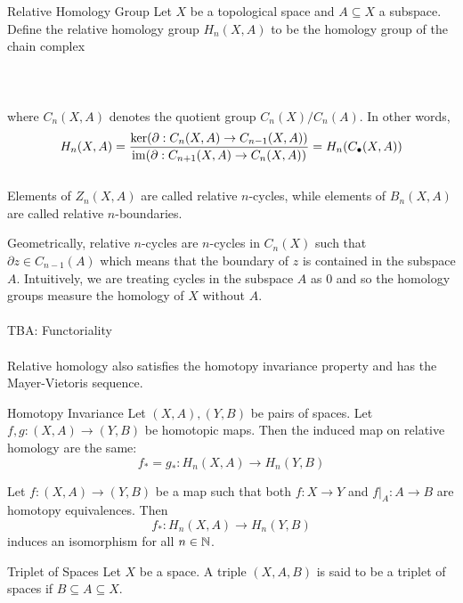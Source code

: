 \documentclass[a4paper]{article}
\begin{document}
\begin{defn}{Relative Homology Group}{} Let $X$ be a topological space and $A\subseteq X$ a subspace. Define the relative homology group $H_n(X,A)$ to be the homology group of the chain complex \\~\\
\\~\\
where $C_n(X,A)$ denotes the quotient group $C_n(X)/C_n(A)$. In other words, $$H_n(X,A)=\frac{\ker(\partial:C_n(X,A)\to C_{n-1}(X,A))}{\operatorname{im}(\partial:C_{n+1}(X,A)\to C_n(X,A))}=H_n(C_\bullet(X,A))$$~\\
Elements of $Z_n(X,A)$ are called relative $n$-cycles, while elements of $B_n(X,A)$ are called relative $n$-boundaries. 
\end{defn}

Geometrically, relative $n$-cycles are $n$-cycles in $C_n(X)$ such that $\partial z\in C_{n-1}(A)$ which means that the boundary of $z$ is contained in the subspace $A$. Intuitively, we are treating cycles in the subspace $A$ as $0$ and so the homology groups measure the homology of $X$ without $A$. \\~\\

TBA: Functoriality\\~\\

Relative homology also satisfies the homotopy invariance property and has the Mayer-Vietoris sequence. 

\begin{thm}{Homotopy Invariance}{} Let $(X,A),(Y,B)$ be pairs of spaces. Let $f,g:(X,A)\to(Y,B)$ be homotopic maps. Then the induced map on relative homology are the same: $$f_\ast=g_\ast:H_n(X,A)\to H_n(Y,B)$$ 
\end{thm}

\begin{crl}{}{} Let $f:(X,A)\to (Y,B)$ be a map such that both $f:X\to Y$ and $f|_A:A\to B$ are homotopy equivalences. Then $$f_\ast:H_n(X,A)\to H_n(Y,B)$$ induces an isomorphism for all $n\in\mathbb{N}$. 
\end{crl}

\begin{defn}{Triplet of Spaces}{} Let $X$ be a space. A triple $(X,A,B)$ is said to be a triplet of spaces if $B\subseteq A\subseteq X$. 
\end{defn}
\end{document}
